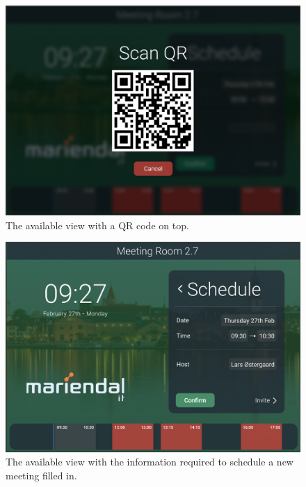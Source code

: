   \begin{figure}[h!]
    \centering
    \includegraphics[width=1\textwidth]{images/available_qr.png}
    \caption{The available view with a QR code on top.}
    \label{fig:available_qr}
  \end{figure}

  \begin{figure}[h!]
    \centering
    \includegraphics[width=1\textwidth]{images/available_host}
    \caption{The available view with the information required to schedule a new meeting filled in.}
    \label{fig:available_host}
  \end{figure}

